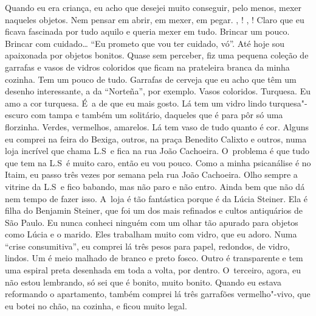Quando eu era criança, eu acho que desejei muito conseguir, pelo menos,
mexer naqueles objetos. Nem pensar em abrir, em mexer, em pegar. 
, ! , ! Claro que eu ficava fascinada por tudo aquilo
e queria mexer em tudo. Brincar um pouco. Brincar com cuidado…
``Eu prometo que vou ter cuidado, vó''. Até hoje sou apaixonada por
objetos bonitos. Quase sem perceber, fiz uma pequena coleção de garrafas
e vasos de vidros coloridos que ficam na prateleira branca da minha
cozinha. Tem um pouco de tudo. Garrafas de cerveja que eu acho que têm
um desenho interessante, a da ``Norteña'', por exemplo. Vasos coloridos.
Turquesa. Eu amo a cor turquesa. É~a de que eu mais gosto. Lá tem um
vidro lindo turquesa"-escuro com tampa e também um solitário, daqueles
que é para pôr só uma florzinha. Verdes, vermelhos, amarelos. Lá tem
vaso de tudo quanto é cor. Alguns eu comprei na feira do Bexiga, outros,
na praça Benedito Calixto e outros, numa loja incrível que chama L.S\, e
fica na rua João Cachoeira. O~problema é que tudo que tem na L.S\, é
muito caro, então eu vou pouco. Como a minha psicanálise é no Itaim, eu
passo três vezes por semana pela rua João Cachoeira. Olho sempre a
vitrine da L.S\, e fico babando, mas não paro e não entro. Ainda bem que
não dá nem tempo de fazer isso. A~loja é tão fantástica porque é da
Lúcia Steiner. Ela é filha do Benjamin Steiner, que foi um dos mais
refinados e cultos antiquários de São Paulo. Eu nunca conheci ninguém
com um olhar tão apurado para objetos como Lúcia e o marido. Eles
trabalham muito com vidro, que eu adoro. Numa ``crise consumitiva'', eu
comprei lá três pesos para papel, redondos, de vidro, lindos. Um é meio
malhado de branco e preto fosco. Outro é transparente e tem uma espiral
preta desenhada em toda a volta, por dentro. O~terceiro, agora, eu não
estou lembrando, só sei que é bonito, muito bonito. Quando eu estava
reformando o apartamento, também comprei lá três garrafões
vermelho"-vivo, que eu botei no chão, na cozinha, e ficou muito legal.

